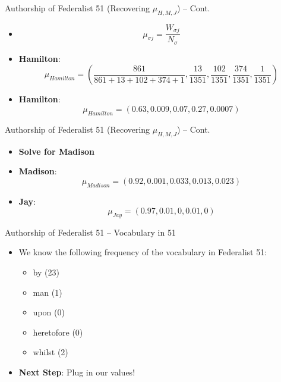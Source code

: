 \documentclass[
  ignorenonframetext,
  aspectratio=169]{beamer}
\begin{document}
\begin{frame}{Authorship of Federalist 51 (Recovering \(\mu_{H,M,J}\))
-- Cont.}
\label{authorship-of-federalist-51-recovering-mu_hmj-cont.}
\begin{itemize}
\item[] $$\mu_{\sigma j} = \frac{W_{\sigma j}}{N_{\sigma}} $$ \par \vspace{2.5mm}
\item[] \textbf{Hamilton}: $$\mu_{Hamilton} = (\frac{861}{861+13+102+374+1},\frac{13}{1351},\frac{102}{1351}, \frac{374}{1351}, \frac{1}{1351})$$ \par \vspace{2.5mm}
\item[] \textbf{Hamilton}: $$ \mu_{Hamilton} = (0.63,0.009,0.07,0.27,0.0007) $$ \par \vspace{2.5mm}
\end{itemize}
\end{frame}

\begin{frame}{Authorship of Federalist 51 (Recovering \(\mu_{H,M,J}\))
-- Cont.}
\label{authorship-of-federalist-51-recovering-mu_hmj-cont.-1}
\begin{itemize}
\item[] \textbf{Solve for Madison} \par \vspace{5mm} \pause
\item[] \textbf{Madison}: $$\mu_{Madison} = (0.92,0.001,0.033,0.013,0.023)$$ \par \vspace{2.5mm}
\item[] \textbf{Jay}: $$\mu_{Jay} = (0.97,0.01,0,0.01,0)$$
\end{itemize}
\end{frame}

\begin{frame}{Authorship of Federalist 51 -- Vocabulary in 51}
\label{authorship-of-federalist-51-vocabulary-in-51}
\begin{itemize}
\item We know the following frequency of the vocabulary in Federalist 51:
  \begin{itemize}
  \item by (23)
  \item man (1)
  \item upon (0)
  \item heretofore (0)
  \item whilst (2)
  \end{itemize} \par \vspace{2.5mm}
  \item \textbf{Next Step}: Plug in our values!
\end{itemize}
\end{frame}
\end{document}
